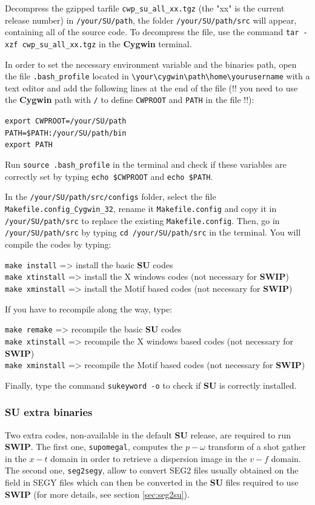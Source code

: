 \documentclass[twoside,a4paper]{article}
\def\SWIP{\textbf{SWIP}}
\def\SU{\textbf{SU}}
\def\Cygwin{\textbf{Cygwin}}
\begin{document}
Decompress the gzipped tarfile \verb|cwp_su_all_xx.tgz| (the "xx" is the current release number) in \verb|/your/SU/path|, the folder \verb|/your/SU/path/src| will appear, containing all of the source code. To decompress the file, use the command \verb|tar -xzf cwp_su_all_xx.tgz| in the {\Cygwin} terminal.

In order to set the necessary environment variable and the binaries path, open the file \verb|.bash_profile| located in \verb|\your\cygwin\path\home\yourusername| with a text editor and add the following lines at the end of the file (!! you need to use the {\Cygwin} path with \verb|/| to define \verb|CWPROOT| and \verb|PATH| in the file !!):

\verb|export CWPROOT=/your/SU/path|\\
\verb|PATH=$PATH:/your/SU/path/bin|\\
\verb|export PATH|

Run \verb|source .bash_profile| in the terminal and check if these variables are correctly set by typing \verb|echo $CWPROOT| and \verb|echo $PATH|.

In the \verb|/your/SU/path/src/configs| folder, select the file \verb|Makefile.config_Cygwin_32|, rename it \verb|Makefile.config| and copy it in \verb|/your/SU/path/src| to replace the existing \verb|Makefile.config|. Then, go in \verb|/your/SU/path/src| by typing \verb|cd /your/SU/path/src| in the terminal. You will compile the codes by typing:

\verb|make install| => install the basic {\SU} codes\\
\verb|make xtinstall| => install the X windows codes (not necessary for {\SWIP})\\
\verb|make xminstall| => install the Motif based codes (not necessary for {\SWIP})

If you have to recompile along the way, type:

\verb|make remake| => recompile the basic {\SU} codes\\
\verb|make xtinstall| => recompile the X windows based codes (not necessary for {\SWIP})\\
\verb|make xminstall| => recompile the Motif based codes (not necessary for {\SWIP})

Finally, type the command \verb|sukeyword -o| to check if {\SU} is correctly installed.

\subsubsection{SU extra binaries}
Two extra codes, non-available in the default {\SU} release, are required to run {\SWIP}. The first one, \verb|supomegal|, computes the $p-\omega$ transform of a shot gather in the $x-t$ domain in order to retrieve a dispersion image in the $v-f$ domain. The second one, \verb|seg2segy|, allow to convert SEG2 files usually obtained on the field in SEGY files which can then be converted in the {\SU} files required to use {\SWIP} (for more details, see section \ref{sec:seg2su}).
\end{document}
